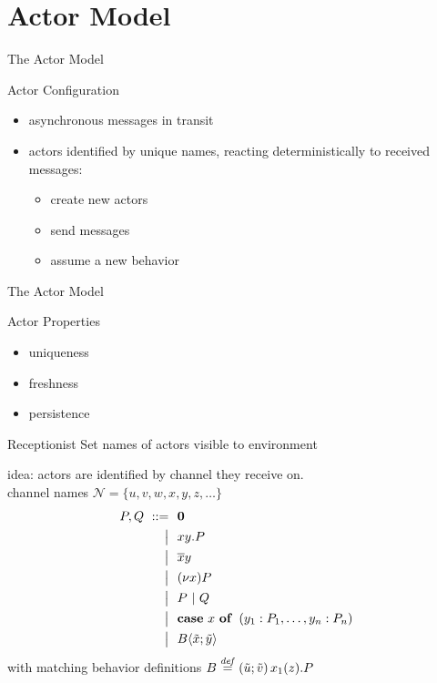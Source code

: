 \documentclass[]{beamer}
\begin{document}
  \section{Actor Model}

    \begin{frame}{The Actor Model}
      \begin{block}{Actor Configuration}
      \begin{itemize}
        \item asynchronous messages in transit
        \item actors identified by unique names,
        reacting deterministically to received messages:
        \pause
        \begin{itemize}
          \item create new actors
          \item send messages
          \item assume a new behavior
        \end{itemize}
      \end{itemize}
      \end{block}
    \end{frame}

    \begin{frame}{The Actor Model}
      \begin{block}{Actor Properties}
      \begin{itemize}
        \item uniqueness
        \item freshness
        \item persistence
      \end{itemize}
      \end{block}
      \pause
      \begin{block}{Receptionist Set}
        names of actors visible to environment
      \end{block}
    \end{frame}

    \begin{frame}{\actorpicalc}
      idea: actors are identified by channel they receive on.\\
      channel names
      $ \mathcal{N} = \{u, v, w, x, y, z, \ldots\} $
      \begin{align*}
        P, Q
        \grmr \anullproc
        \altn \amrcv{x}{y} . P
        \altn \amsnd{x}{y}
        \altn \anew{x}{P}
        \altn P \apar Q
        \altn \acse{x}{\aalt{y_1}{P_1}, \dots, \aalt{y_n}{P_n}}
        \altn \ains{B}{\tilde{x}}{\tilde{y}}
      \end{align*}
      with matching behavior definitions
      $\adef{B}{\tilde{u}}{\tilde{v}}{\arcv{x_1}{z} . P}$
    \end{frame}
    \note{
    }
\end{document}
